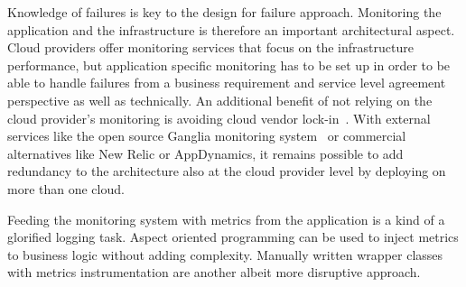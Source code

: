 \documentclass[english]{tktltiki2}
\theoremstyle{definition}
\theoremstyle{remark}
\begin{document}
Knowledge of failures is key to the design for failure approach. Monitoring the
application and the infrastructure is therefore an important architectural
aspect. Cloud providers offer monitoring services that focus on the
infrastructure performance, but application specific monitoring has to be set up
in order to be able to handle failures from a business requirement and service
level agreement perspective as well as technically. An additional benefit of not
relying on the cloud provider's monitoring is avoiding cloud vendor 
lock-in~\cite{Petcu2012}. With external services like the open source Ganglia
monitoring system~\cite{gangliapaper} or commercial alternatives like New Relic
or AppDynamics, it remains possible to add redundancy to the architecture also
at the cloud provider level by deploying on more than one cloud.

Feeding the monitoring system with metrics from the application is a kind of a
glorified logging task. Aspect oriented programming can be used to inject
metrics to business logic without adding complexity. Manually written wrapper
classes with metrics instrumentation are another albeit more disruptive
approach.



\end{document}
